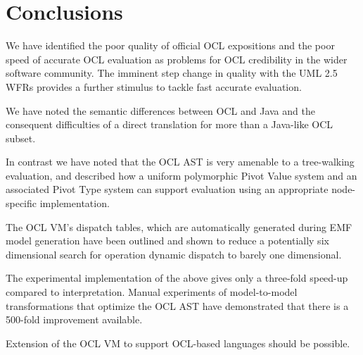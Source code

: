 \documentclass{acm_proc_article-sp}
\begin{document}
\section{Conclusions}
We have identified the poor quality of official OCL expositions and the poor speed of accurate OCL
evaluation as problems for OCL credibility in the wider software community. The imminent step
change in quality with the UML 2.5 WFRs provides a further stimulus to tackle fast accurate evaluation.

We have noted the semantic differences between OCL and Java and the consequent difficulties of a direct
translation for more than a Java-like OCL subset.

In contrast we have noted that the OCL AST is very amenable to a tree-walking evaluation, and described how
a uniform polymorphic Pivot Value system and an associated Pivot Type system can support evaluation using
an appropriate node-specific implementation.

The OCL VM's dispatch tables, which are automatically generated during EMF model generation
have been outlined and shown to reduce a potentially six dimensional search for operation
dynamic dispatch to barely one dimensional.

The experimental implementation of the above gives only a three-fold speed-up compared to interpretation. Manual
experiments of model-to-model transformations that optimize the OCL AST have demonstrated that there is a 
500-fold improvement available.

Extension of the OCL VM to support OCL-based languages should be possible.

%


%
%
\balancecolumns
\end{document}
